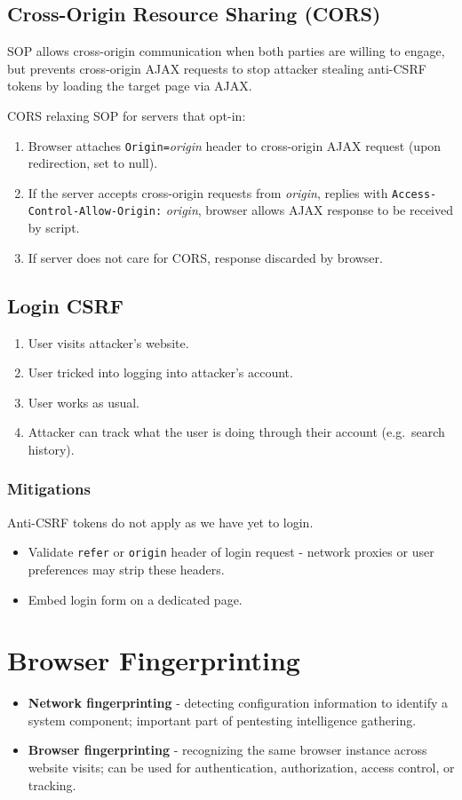 \documentclass[11pt]{article}
\begin{document}
\subsection{Cross-Origin Resource Sharing (CORS)}
SOP allows cross-origin communication when both parties are willing to engage, but prevents cross-origin AJAX requests to stop attacker stealing anti-CSRF tokens by loading the target page via AJAX.

CORS relaxing SOP for servers that opt-in:
\begin{enumerate}
  \item Browser attaches \texttt{Origin=}\textit{origin} header to cross-origin AJAX request (upon redirection, set to null).
  \item If the server accepts cross-origin requests from \textit{origin}, replies with \texttt{Access-Control-Allow-Origin:} \textit{origin}, browser allows AJAX response to be received by script.
  \item If server does not care for CORS, response discarded by browser.
\end{enumerate}

\subsection{Login CSRF}
\begin{enumerate}
  \item User visits attacker's website.
  \item User tricked into logging into attacker's account.
  \item User works as usual.
  \item Attacker can track what the user is doing through their account (e.g.\ search history).
\end{enumerate}

\subsubsection{Mitigations}
Anti-CSRF tokens do not apply as we have yet to login.
\begin{itemize}
  \item Validate \texttt{refer} or \texttt{origin} header of login request - network proxies or user preferences may strip these headers.
  \item Embed login form on a dedicated page.
\end{itemize}

\section{Browser Fingerprinting}
\begin{itemize}
  \item \textbf{Network fingerprinting} - detecting configuration information to identify a system component; important part of pentesting intelligence gathering.
  \item \textbf{Browser fingerprinting} - recognizing the same browser instance across website visits; can be used for authentication, authorization, access control, or tracking.
\end{itemize}
\end{document}
